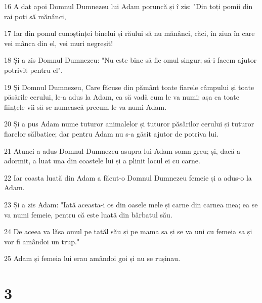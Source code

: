 \par 16 A dat apoi Domnul Dumnezeu lui Adam poruncă și î zis: "Din toți pomii din rai poți să mănânci,
\par 17 Iar din pomul cunoștinței binelui și răului să nu mănânci, căci, în ziua în care vei mânca din el, vei muri negreșit!
\par 18 Și a zis Domnul Dumnezeu: "Nu este bine să fie omul singur; să-i facem ajutor potrivit pentru el".
\par 19 Și Domnul Dumnezeu, Care făcuse din pământ toate fiarele câmpului și toate păsările cerului, le-a adus la Adam, ca să vadă cum le va numi; așa ca toate ființele vii să se numească precum le va numi Adam.
\par 20 Și a pus Adam nume tuturor animalelor și tuturor păsărilor cerului și tuturor fiarelor sălbatice; dar pentru Adam nu s-a găsit ajutor de potriva lui.
\par 21 Atunci a adus Domnul Dumnezeu asupra lui Adam somn greu; și, dacă a adormit, a luat una din coastele lui și a plinit locul ei cu carne.
\par 22 Iar coasta luată din Adam a făcut-o Domnul Dumnezeu femeie și a adus-o la Adam.
\par 23 Și a zis Adam: "Iată aceasta-i os din oasele mele și carne din carnea mea; ea se va numi femeie, pentru că este luată din bărbatul său.
\par 24 De aceea va lăsa omul pe tatăl său și pe mama sa și se va uni cu femeia sa și vor fi amândoi un trup."
\par 25 Adam și femeia lui erau amândoi goi și nu se rușinau.

\chapter{3}

